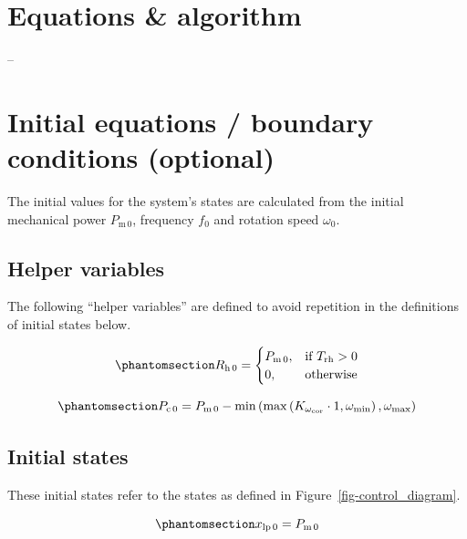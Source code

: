 \documentclass[
  a4paper,
  DIV=11,
  numbers=noendperiod]{scrartcl}
\begin{document}
\section{Equations \& algorithm ~}\label{equations-algorithm}

--

\section{Initial equations / boundary conditions
(optional)}\label{initial-equations-boundary-conditions-optional}

The initial values for the system's states are calculated from the
initial mechanical power \(P_\mathrm{m\,0}\), frequency \(f_\mathrm{0}\)
and rotation speed \(\omega_\mathrm{0}\).~

\subsection{Helper variables}\label{helper-variables}

The following ``helper variables'' are defined to avoid repetition in
the definitions of initial states below.

\begin{equation}\phantomsection\label{eq-initReheat}{
R_\mathrm{h\,0} = 
\begin{cases}
    P_\mathrm{m\,0} ,& \text{if } T_\mathrm{rh} > 0\\
    0,              & \text{otherwise}
\end{cases}
}\end{equation}

\begin{equation}\phantomsection\label{eq-initPc}{
P_\mathrm{c\,0} = P_{\text{m}\,0} - \min\left(\max\left(K_{\omega_{\text{cor}}} \cdot 1, \omega_{\text{min}}\right), \omega_{\text{max}}\right)
}\end{equation}

\subsection{Initial states}\label{initial-states}

These initial states refer to the states as defined in
Figure~\ref{fig-control_diagram}.

\begin{equation}\phantomsection\label{eq-initXlp}{
x_\mathrm{lp\,0} = P_\mathrm{m\,0}
}\end{equation}
\end{document}
